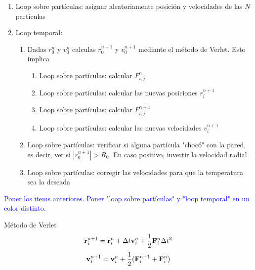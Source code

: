\documentclass[aps,prb,twocolumn,superscriptaddress,floatfix,longbibliography]{revtex4-2}
\newcounter{para}
\begin{document}
\begin{enumerate}
    \item Loop sobre partículas: asignar aleatoriamente posición y velocidades de las $N$ partículas
    \item Loop temporal:
    \begin{enumerate}
        \item Dadas $r_0^n$ y $v_0^n$ calculas $r_0^{n+1}$ y $v_0^{n+1}$ mediante el método de Verlet. Esto implica
        \begin{enumerate}
            \item Loop sobre partículas: calcular $F_{i,j}^n$
            \item Loop sobre partículas: calcular las nuevas posiciones $r_{i}^{n+1}$
            \item Loop sobre partículas: calcular $F_{i,j}^{n+1}$
            \item Loop sobre partículas: calcular las nuevas velocidades $v_{i}^{n+1}$
        \end{enumerate}
        \item Loop sobre partículas: verificar si alguna partícula "chocó" con la pared, es decir, ver si $|r_0^{n+1}| > R_0$. En caso positivo, invertir la velocidad radial
        \item Loop sobre partículas: corregir las velocidades para que la temperatura sea la deseada
    \end{enumerate}
\end{enumerate}
\textcolor{blue}{Poner los items anteriores. Poner "loop sobre partículas" y "loop temporal" en un color distinto.}

Método de Verlet
\[\bold{r}^{n+1}_i = \bold{r}^n_i + \Delta t \bold{v}^n_i  + \frac{1}{2} \bold{F}^n_i \Delta t ^2\]
\[\bold{v}^{n+1}_i = \bold{v}^n_i + \frac{1}{2} (\bold{F}^{n+1}_i + \bold{F}^{n}_i)\]
\end{document}
